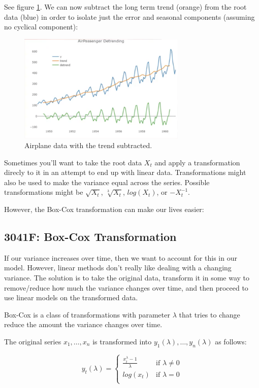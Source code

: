 \documentclass[12pt]{article}
\begin{document}
    See figure \ref{fig:airplane_data_less_trend}. 
    We can now subtract the long term trend (orange) from the root data (blue) 
    in order to isolate just the error and seasonal components (assuming no 
    cyclical component):
    \begin{figure}[t]
        \centering
        \includegraphics[width=8cm]{airplane_data_less_trend}
        \caption{Airplane data with the trend subtracted.}
        \label{fig:airplane_data_less_trend}
    \end{figure}

    Sometimes you'll want to take the root data $X_t$ and apply a transformation direcly to it
    in an attempt to end up with linear data. Transformations might also be used to make the variance equal across the series.
    Possible transformations might be $\sqrt{X_t}$, $\sqrt[3]{X_t}$, $log(X_t)$, or $-X_t^{-1}$.

    However, the Box-Cox transformation can make our lives easier:

    \subsection{3041F: Box-Cox Transformation}
    If our variance increases over time, then we want to account for this in our model. However, linear methods don't really like dealing with a changing variance. The solution is to take the original data, transform it in some way to remove/reduce how much the variance changes over time, and then proceed to use linear models on the transformed data.

    Box-Cox is a class of transformations with parameter $\lambda$  that tries to change reduce the amount the variance changes over time.

    The original series $x_1, \dots, x_n$ is transformed into $y_1(\lambda), \dots, y_n(\lambda)$ as follows:

    \begin{equation*}
        y_t(\lambda) =
        \begin{cases}
            \frac{x_t^{\lambda} - 1}{\lambda}  & \text{if $\lambda \ne 0$} \\[2ex]
            log(x_t) & \text{if $\lambda = 0$} \\
        \end{cases}
        \end{equation*}
\end{document}

